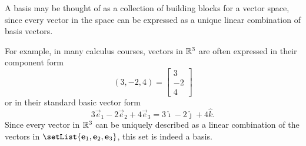 \begin{observation}
  A basis may be thought of as a collection of building blocks for a vector
  space,  since every vector in the space can be expressed as a unique linear
  combination of basis vectors.

  \vspace{1em}

  For example, in many calculus courses, vectors in \(\mathbb{R}^3\)
  are often expressed in their component form
  \[
    (3,-2,4)=\begin{bmatrix}3 \\ -2 \\ 4\end{bmatrix}
  \]
  or in their standard basic vector form
  \[
    3\vec e_1-2\vec e_2+4\vec e_3 = 3\hat\imath-2\hat\jmath+4\hat k
  .\]
  Since every vector in \(\mathbb{R}^3\) can be uniquely described as a linear
  combination of the vectors in \(\setList{\vec e_1,\vec e_2,\vec e_3}\),
  this set is indeed a basis.
\end{observation}



